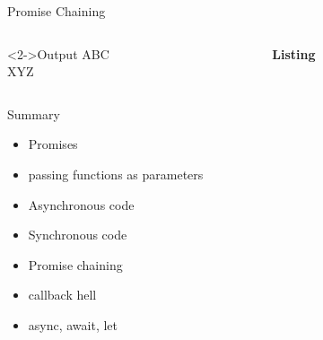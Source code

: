 \documentclass[pdf,table]{beamer}
\begin{document}
\begin{frame}{Promise Chaining \cite{parker:2015}}
	\begin{columns}[T]
		\begin{column}{0.20\textwidth}
			\begin{block}<2->{Output}
				ABC \\
				XYZ
			\end{block}
		\end{column}
		\begin{column}{0.75\textwidth}
			{\bf Listing}
			
		\end{column}
	\end{columns}	
\end{frame}


%
%			



%
%

\begin{frame}{Summary}
	\begin{itemize}
		\item Promises 
		\item passing functions as parameters
		\item Asynchronous code
		\item Synchronous code
		\item Promise chaining
		\item callback hell
		\item async, await, let
	\end{itemize}
\end{frame}
\end{document}
